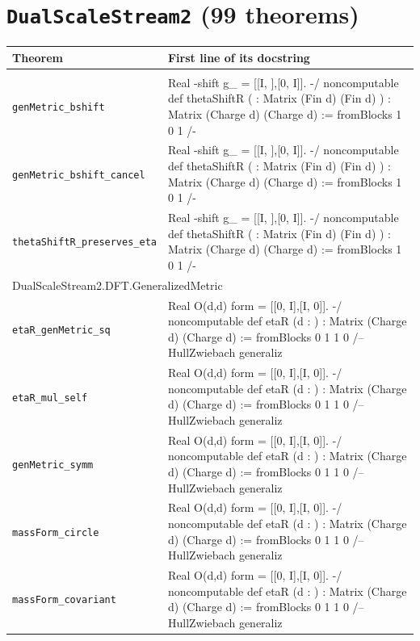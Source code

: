 \section*{\texttt{DualScaleStream2} (99 theorems)}
\begin{longtable}{p{}p{}}\toprule Theorem & First line of its docstring \\ \midrule\endhead\bottomrule\endfoot
\multicolumn{2}{l}{\textsf{\small DualScaleStream2.DFT.BShift}} \\
\quad\texttt{\footnotesize genMetric\_bshift} & {\footnotesize Real -shift g\_ = [[I, ],[0, I]]. -/ noncomputable def thetaShiftR ( : Matrix (Fin d) (Fin d) ) : Matrix (Charge d) (Charge d)  := fromBlocks 1  0 1 /-} \\
\quad\texttt{\footnotesize genMetric\_bshift\_cancel} & {\footnotesize Real -shift g\_ = [[I, ],[0, I]]. -/ noncomputable def thetaShiftR ( : Matrix (Fin d) (Fin d) ) : Matrix (Charge d) (Charge d)  := fromBlocks 1  0 1 /-} \\
\quad\texttt{\footnotesize thetaShiftR\_preserves\_eta} & {\footnotesize Real -shift g\_ = [[I, ],[0, I]]. -/ noncomputable def thetaShiftR ( : Matrix (Fin d) (Fin d) ) : Matrix (Charge d) (Charge d)  := fromBlocks 1  0 1 /-} \\
\multicolumn{2}{l}{\textsf{\small DualScaleStream2.DFT.GeneralizedMetric}} \\
\quad\texttt{\footnotesize etaR\_genMetric\_sq} & {\footnotesize Real O(d,d) form  = [[0, I],[I, 0]]. -/ noncomputable def etaR (d : ) : Matrix (Charge d) (Charge d)  := fromBlocks 0 1 1 0 /-- HullZwiebach generaliz} \\
\quad\texttt{\footnotesize etaR\_mul\_self} & {\footnotesize Real O(d,d) form  = [[0, I],[I, 0]]. -/ noncomputable def etaR (d : ) : Matrix (Charge d) (Charge d)  := fromBlocks 0 1 1 0 /-- HullZwiebach generaliz} \\
\quad\texttt{\footnotesize genMetric\_symm} & {\footnotesize Real O(d,d) form  = [[0, I],[I, 0]]. -/ noncomputable def etaR (d : ) : Matrix (Charge d) (Charge d)  := fromBlocks 0 1 1 0 /-- HullZwiebach generaliz} \\
\quad\texttt{\footnotesize massForm\_circle} & {\footnotesize Real O(d,d) form  = [[0, I],[I, 0]]. -/ noncomputable def etaR (d : ) : Matrix (Charge d) (Charge d)  := fromBlocks 0 1 1 0 /-- HullZwiebach generaliz} \\
\quad\texttt{\footnotesize massForm\_covariant} & {\footnotesize Real O(d,d) form  = [[0, I],[I, 0]]. -/ noncomputable def etaR (d : ) : Matrix (Charge d) (Charge d)  := fromBlocks 0 1 1 0 /-- HullZwiebach generaliz} \\

\end{longtable}

